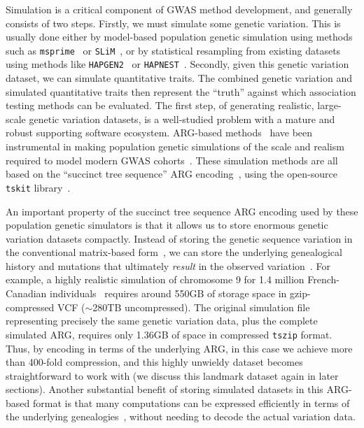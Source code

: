 \documentclass[unnumsec,webpdf,modern,large,namedate]{oup-authoring-template}%
\begin{document}
Simulation is a critical component of GWAS method development, and
generally consists of two steps.
Firstly, we must simulate some genetic variation. This is
usually done either by model-based population genetic
simulation using methods such as
\texttt{msprime}~\citep{baumdicker2022efficient}
or \texttt{SLiM}~\citep{haller2023},
or by statistical resampling from existing datasets
using methods like \texttt{HAPGEN2}~\citep{su2011hapgen2}
or \texttt{HAPNEST}~\citep{wharrie2023hapnest}.
Secondly, given this genetic variation dataset, we can
simulate quantitative traits.
The combined genetic variation and
simulated quantitative traits then represent the ``truth'' against
which association testing methods can be evaluated.
The first step, of generating realistic, large-scale genetic variation
datasets, is a well-studied problem with a mature and robust supporting
software ecosystem. ARG-based methods~\citep{kelleher2016efficient,
kelleher2018efficient,haller2018tree,adrion2020,baumdicker2022efficient,anderson2023}
have been instrumental in making population genetic simulations
of the scale and realism
required to model modern GWAS cohorts~\cite[e.g.][]{martin2017,zaidi2020}.
These simulation methods are all based on the ``succinct tree
sequence'' ARG encoding~\citep{wong2023general},
using the open-source \texttt{tskit} library~\citep{ralph2020}.

An important property of the succinct tree sequence ARG encoding
used by these population genetic simulators is that it allows us to
store enormous genetic variation datasets compactly. Instead of
storing the genetic sequence variation in the conventional
matrix-based form~\citep[e.g.\ VCF,][]{danecek2011},
we can store the underlying genealogical history
and mutations that ultimately \emph{result} in the observed
variation~\citep{kelleher2019}.
For example, a highly realistic simulation
of chromosome 9 for 1.4 million
French-Canadian individuals~\citep{anderson2023}
requires around 550GB of storage space in
gzip-compressed VCF ($\sim$280TB uncompressed).
The original simulation file representing
precisely the same genetic variation data, plus the
complete simulated ARG, requires only 1.36GB of space
in compressed \texttt{tszip} format. Thus,
by encoding in terms of the underlying ARG,
in this case we achieve more than 400-fold compression,
and this highly unwieldy dataset
becomes straightforward to work with (we discuss this
landmark dataset again in later sections).
Another substantial benefit of storing simulated datasets
in this ARG-based format is that many computations can
be expressed efficiently in terms of the underlying
genealogies~\citep{kelleher2016efficient,ralph2020}, without
needing to decode the actual variation data.
\end{document}
